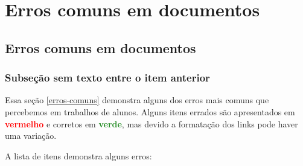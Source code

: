 \chapter{Erros comuns em documentos}
\label{erros-comuns-capitulo}

\section{Erros comuns em documentos}
\label{erros-comuns}


\subsection{Subseção sem texto entre o item anterior}
\label{erros-comuns-sub1}

\newcommand{\errado}[1]{\textbf{\textcolor{red}{#1}}}
\newcommand{\certo}[1]{\textbf{\textcolor{ForestGreen}{#1}}}
\newcommand{\erradocerto}[3]{\item #1 :\begin{itemize}
    \item \errado{#2}
    \item \certo{#3}
\end{itemize}}
\newcommand{\erradoerradocerto}[4]{\item #1 :\begin{itemize}
    \item \errado{#2}
    \item \errado{#3}
    \item \certo{#4}
\end{itemize}}


Essa seção \autoref{erros-comuns} demonstra alguns dos erros mais comuns que percebemos em trabalhos de alunos. Alguns itens errados são apresentados em \errado{vermelho} e corretos em \certo{verde}, mas devido a formatação dos links pode haver uma variação.

A lista de itens demonstra alguns erros:

